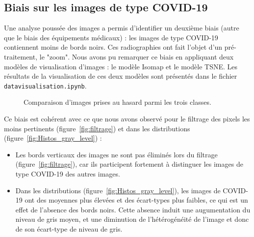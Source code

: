 \documentclass[11pt,twoside,openright]{article}
\def\code#1{\texttt{#1}}
\begin{document}
\subsection{Biais sur les images de type COVID-19}
Une analyse poussée des images a permis d'identifier un deuxième biais (autre que le biais des équipements médicaux) : les images de type COVID-19 contiennent moins de bords noirs. Ces radiographies ont fait l'objet d'un pré-traitement, le "zoom". 
Nous avons pu remarquer ce biais en appliquant deux modèles de visualisation d'images : le modèle Isomap et le modèle TSNE. Les résultats de la visualisation de ces deux modèles sont présentés dans le fichier \code{datavisualisation.ipynb}.

\begin{figure}[htbp]
  \centering
  \caption{Comparaison d'images prises au hasard parmi les trois classes.}
  \label{fig:comp_vis}
\end{figure}


Ce biais est cohérent avec ce que nous avons observé pour le filtrage des pixels les moins pertinents (figure~\ref{fig:filtrage}) et dans les distributions (figure~\ref{fig:Histos_gray_level}) :
\begin{itemize}
    \item Les bords verticaux des images ne sont pas éliminés lors du filtrage (figure~\ref{fig:filtrage}), car ils participent fortement à distinguer les images de type COVID-19 des autres images.
    \item Dans les distributions (figure~\ref{fig:Histos_gray_level}), les images de COVID-19 ont des moyennes plus élevées et des écart-types plus faibles, ce qui est un effet de l'absence des bords noirs. Cette absence induit une augumentation du niveau de gris moyen, et une diminution de l'hétérogénéité de l'image et donc de son écart-type de niveau de gris.
\end{itemize}
\end{document}
